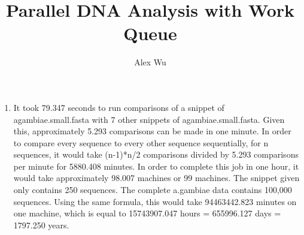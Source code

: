 \documentclass{article}
\title{Parallel DNA Analysis with Work Queue}
\author{Alex Wu}
\begin{document}
\maketitle

\begin{enumerate}
\item{%
It took 79.347 seconds to run comparisons of a snippet of agambiae.small.fasta with 7 other snippets of agambiae.small.fasta. Given this, approximately 5.293 comparisons can be made in one minute. In order to compare every sequence to every other sequence sequentially, for n sequences, it would take (n-1)*n/2 comparisons divided by 5.293 comparisons per minute for 5880.408 minutes. In order to complete this job in one hour, it would take approximately 98.007 machines or 99 machines. The snippet given only contains 250 sequences. The complete a.gambiae data contains 100,000 sequences. Using the same formula, this would take 94463442.823 minutes on one machine, which is equal to 15743907.047 hours = 655996.127 days = 1797.250 years.

}


\end{enumerate}
\end{document}
